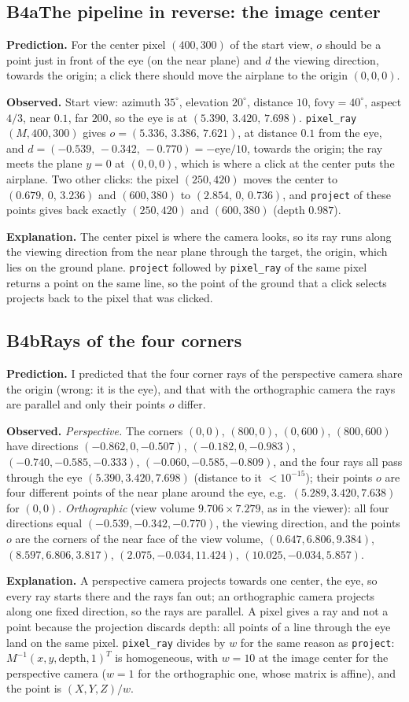 \documentclass[10pt,a4paper]{article}
\newcommand{\experiment}[5]{%
  \subsection*{#1\quad #2}
  \textbf{Prediction.} #3\par
  \textbf{Observed.} #4\par
  \textbf{Explanation.} #5\par
}
\begin{document}
\experiment{B4a}{The pipeline in reverse: the image center}
  {For the center pixel $(400,300)$ of the start view, $o$ should be a point just in front of the eye (on the near
   plane) and $d$ the viewing direction, towards the origin; a click there should move the airplane to the
   origin $(0,0,0)$.}
  {Start view: azimuth $35^\circ$, elevation $20^\circ$, distance $10$, $\mathrm{fovy}=40^\circ$, aspect $4/3$,
   near $0.1$, far $200$, so the eye is at $(5.390,\,3.420,\,7.698)$. \texttt{pixel\_ray}$(M,400,300)$ gives
   $o=(5.336,\,3.386,\,7.621)$, at distance $0.1$ from the eye, and $d=(-0.539,\,-0.342,\,-0.770)=-\mathrm{eye}/10$,
   towards the origin; the ray meets the plane $y=0$ at $(0,0,0)$, which is where a click at the center
   puts the airplane. Two other clicks: the pixel $(250,420)$ moves the center to $(0.679,\,0,\,3.236)$ and
   $(600,380)$ to $(2.854,\,0,\,0.736)$, and \texttt{project} of these points gives back exactly $(250,420)$ and
   $(600,380)$ (depth $0.987$).}
  {The center pixel is where the camera looks, so its ray runs along the viewing direction from the near plane
   through the target, the origin, which lies on the ground plane. \texttt{project} followed by \texttt{pixel\_ray}
   of the same pixel returns a point on the same line, so the point of the ground that a click selects projects
   back to the pixel that was clicked.}

\experiment{B4b}{Rays of the four corners}
  {I predicted that the four corner rays of the perspective camera share the origin (wrong: it is the eye), and that
   with the orthographic camera the rays are parallel and only their points $o$ differ.}
  {\emph{Perspective.} The corners $(0,0)$, $(800,0)$, $(0,600)$, $(800,600)$ have directions
   $(-0.862,0,-0.507)$, $(-0.182,0,-0.983)$, $(-0.740,-0.585,-0.333)$, $(-0.060,-0.585,-0.809)$, and the four
   rays all pass through the eye $(5.390,3.420,7.698)$ (distance to it $<10^{-15}$); their points $o$ are four
   different points of the near plane around the eye, e.g.\ $(5.289,3.420,7.638)$ for $(0,0)$.
   \emph{Orthographic} (view volume $9.706\times7.279$, as in the viewer): all four directions equal
   $(-0.539,-0.342,-0.770)$, the viewing direction, and the points $o$ are the corners of the near face of the
   view volume, $(0.647,6.806,9.384)$, $(8.597,6.806,3.817)$, $(2.075,-0.034,11.424)$, $(10.025,-0.034,5.857)$.}
  {A perspective camera projects towards one center, the eye, so every ray starts there and the rays fan out;
   an orthographic camera projects along one fixed direction, so the rays are parallel. A pixel gives a ray and
   not a point because the projection discards depth: all points of a line through the eye land on the same pixel.
   \texttt{pixel\_ray} divides by $w$ for the same reason as \texttt{project}: $M^{-1}(x,y,\mathrm{depth},1)^T$ is
   homogeneous, with $w=10$ at the image center for the perspective camera ($w=1$ for the orthographic one,
   whose matrix is affine), and the point is $(X,Y,Z)/w$.}
\end{document}
